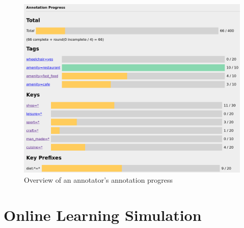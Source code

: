 \begin{figure}[h]
  \centering
  \includegraphics[width=\textwidth]{fig/annotation_progress.png}
  \caption[Annotation progress overview]{Overview of an annotator’s annotation
    progress}
  \label{fig:annotation-progress}
\end{figure}

\section{Online Learning Simulation}
\label{sec:online-simulation}

